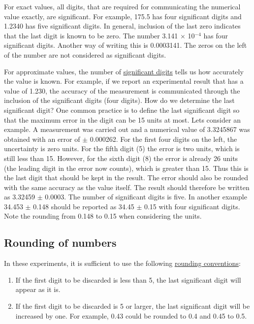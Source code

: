 \documentclass[byrevtex,amssymb,aps,pra,floatfix,letterpaper]{revtex4}
\begin{document}
For exact values, all digits, that are required for communicating the numerical value exactly, are significant. For example, 175.5 has four significant digits and 1.2340 has five significant digits. In general, inclusion of the last zero indicates that the last digit is known to be zero. The number 3.141 $\times$ 10$^{-4}$ has four significant digits. Another way of writing this is 0.0003141. The zeros on the left of the number are not considered as significant digits.

For approximate values, the number of \href{http://en.wikipedia.org/wiki/Significant_figures}{\underline{significant digits}} tells us how accurately the value is known. For example, if we report an experimental result that has a value of 1.230, the accuracy of the measurement is communicated through the inclusion of the significant digits (four digits). How do we determine the last significant digit? One common practice is to define the last significant digit so that the maximum error in the digit can be 15 units at most. Lets consider an example. A measurement was carried out and a numerical value of 3.3245867 was obtained with an error of $\pm$ 0.000262. For the first four digits on the left, the uncertainty is zero units. For the fifth digit (5) the error is two units, which is still less than 15. However, for the sixth digit (8) the error is already 26 units (the leading digit in the error now counts), which is greater than 15. Thus this is the last digit that should be kept in the result. The error should also be rounded with the same accuracy as the value itself. The result should therefore be written as 3.32459 $\pm$ 0.0003. The number of significant digits is five. In another example 34.453 $\pm$ 0.148 should be reported as 34.45 $\pm$ 0.15 with four significant digits. Note the rounding from 0.148 to 0.15 when considering the units.

\subsection{Rounding of numbers}

In these experiments, it is sufficient to use the following \href{http://en.wikipedia.org/wiki/Rounding}{\underline{rounding conventions}}:

\begin{enumerate}
\item If the first digit to be discarded is less than 5, the last significant digit will appear as it is.
\item If the first digit to be discarded is 5 or larger, the last significant digit will be increased by one.
For example, 0.43 could be rounded to 0.4 and 0.45 to 0.5.
\end{enumerate}
\end{document}
